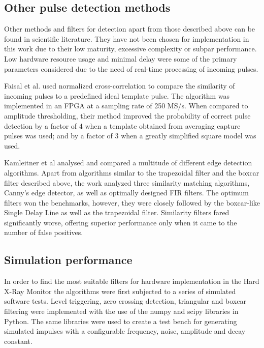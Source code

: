 \subsection{Other pulse detection methods}

Other methods and filters for detection apart from those described above
can be found in scientific literature. They have not been chosen
for implementation in this work due to their low maturity,
excessive complexity or subpar performance. 
Low hardware resource usage and minimal delay
were some of the primary parameters considered due to 
the need of real-time processing of incoming pulses.


Faisal et al. used normalized cross-correlation to compare
the similarity of incoming pulses to a predefined ideal template pulse.
The algorithm was implemented in an FPGA at a sampling rate of 250 MS/s.
When compared to amplitude thresholding, 
their method improved the probability of correct pulse detection by a factor of 4
when a template obtained from averaging capture pulses was used;
and by a factor of 3 when a greatly simplified square model was used.
\cite{detection_cross_correlation}


Kamleitner et al analysed and compared a multitude
of different edge detection algorithms. 
Apart from algorithms similar to the trapezoidal filter and the boxcar
filter described above, the work analyzed three similarity matching algorithms,
Canny's edge detector, as well as optimally designed FIR filters.
The optimum filters won the benchmarks, however, they were closely followed by
the boxcar-like Single Delay Line as well as the trapezoidal filter.
Similarity filters fared significantly worse, offering superior performance
only when it came to the number of false positives.
\cite{pulse_processing_methods}

\subsection{Simulation performance}

In order to find the most suitable filters for hardware implementation
in the Hard X-Ray Monitor the algorithms were first subjected to a
series of simulated software tests.
Level triggering, zero crossing detection, triangular and boxcar 
filtering were implemented with the use of the numpy and scipy
libraries in Python. 
The same libraries were used to create a test bench for generating
simulated impulses with a configurable frequency, noise, amplitude and decay constant.


